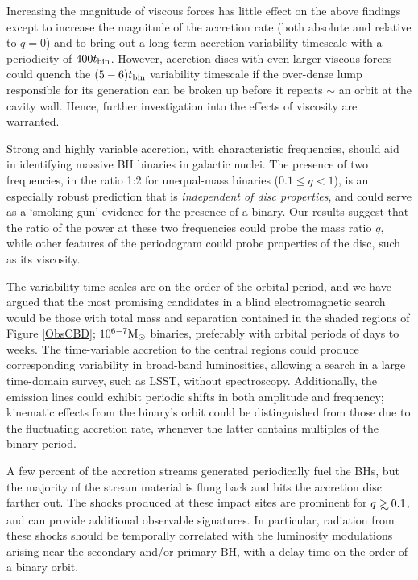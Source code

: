 Increasing the magnitude of viscous forces has little effect on the above findings except to increase the magnitude of the accretion rate (both absolute and relative to $q=0$) and to bring out a long-term accretion variability timescale with a periodicity of $400 t_{\rm bin}$. However, accretion discs with even larger viscous forces could quench the $(5-6)t_{\rm bin}$ variability timescale if the over-dense lump responsible for its generation can be broken up before it repeats $\sim$ an orbit at the cavity wall. Hence, further investigation into the effects of viscosity are warranted.

Strong and highly variable accretion, with characteristic
frequencies, should aid in identifying massive BH binaries in galactic
nuclei.  The presence of two frequencies, in the ratio 1:2 for unequal-mass binaries ($0.1 \leq q < 1$), is an
especially robust prediction that is {\em independent of disc
  properties}, and could serve as a `smoking gun' evidence for the
presence of a binary.  Our results suggest that the ratio of the power
at these two frequencies could probe the mass ratio $q$, while other
features of the periodogram could probe properties of the disc, such
as its viscosity.


The variability time-scales are on the order of the orbital period,
and we have argued that the most promising candidates in a blind
electromagnetic search would be those with total mass and separation contained in the shaded regions of Figure \ref{ObsCBD}; $10^{6-7} {\rm M_\odot}$ binaries,
preferably with orbital periods of days to weeks.  The time-variable accretion to
the central regions could produce corresponding variability in
broad-band luminosities, allowing a search in a large time-domain
survey, such as LSST, without spectroscopy.  Additionally, the
emission lines could exhibit periodic shifts in both amplitude and
frequency; kinematic effects from the binary's orbit could be
distinguished from those due to the fluctuating accretion rate,
whenever the latter contains multiples of the binary period.

A few percent of the accretion streams generated periodically fuel the BHs,
but the majority of the stream material is flung back and hits the accretion
disc farther out. The shocks produced at these impact sites are
prominent for $q\gsim 0.1$, and can provide additional observable
signatures.  In particular, radiation from these shocks should be
temporally correlated with the luminosity modulations arising near the
secondary and/or primary BH, with a delay time on the order of a
binary orbit.

